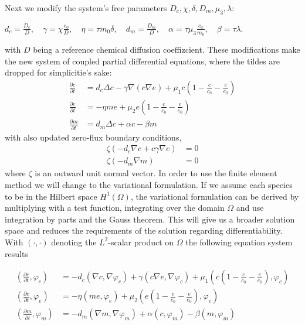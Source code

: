 Next we modify the system's free parameters $D_c, \chi, \delta, D_m, \mu_3, \lambda$:  
\begin{center}
    $d_c = \frac{D_c}{D},\quad \gamma = \chi \frac{e_0}{D},\quad \eta = \tau m_0 \delta,\quad d_m = \frac{D_m}{D},\quad \alpha = \tau \mu_3 \frac{c_0}{m_0},\quad \beta = \tau \lambda$.
\end{center} 
with $D$ being a reference chemical diffusion coeffizcient.\newline 
These modifications make the new system of coupled partial differential equations, where the tildes are dropped for simplicitie's sake:
\begin{align}
	\frac{\partial c}{\partial t} &= d_c \Delta c - \gamma \nabla (c\nabla e)  + \mu_1 c\left(1-\frac{c}{c_0}-\frac{e}{e_0}\right)\label{eq:6}\\
	\frac{\partial e}{\partial t} &= -\eta m e  + \mu_2 e\left(1-\frac{c}{c_0}-\frac{e}{e_0}\right)\label{eq:7}\\
	\frac{\partial m}{\partial t} &= d_m \Delta c + \alpha c - \beta m\label{eq:8}
\end{align}
with also updated zero-flux boundary conditions, 
\begin{align}
	\zeta (-d_c \nabla c + c \gamma \nabla e) &= 0\label{eq:9}\\
	\zeta (-d_m\nabla m ) &= 0\label{eq:10}
\end{align}
where $\zeta$ is an outward unit normal vector.\newline 
In order to use the finite element method we will change to the variational formulation. If we assume each species to be in the Hilbert space $H^1(\Omega)$, the variational formulation can be derived by multiplying with a test function, integrating over the domain $\Omega$ and use integration by parts and the Gauss theorem. This will give us a broader solution space and reduces the requirements of the solution regarding differentiability. With $\left(\cdot, \cdot\right)$ denoting the $L^2$-scalar product on $\Omega$ the following equation system results

\begin{align}
    \left(\frac{\partial c}{\partial t}, \varphi_c\right) &=
        - d_c\left(\nabla c, \nabla \varphi_c\right) + \gamma \left(c\nabla e, \nabla \varphi_c\right) + \mu_1 \left(c \left(1-\frac{c}{c_0} - \frac{e}{e_0}\right), \varphi_c\right) \label{eq:11}\\
    \left(\frac{\partial e}{\partial t}, \varphi_e\right) &=  -\eta \left( me, \varphi_e\right) + \mu_2 \left(e\left(1-\frac{c}{c_0}-\frac{e}{e_0}\right),\varphi_e\right) \label{eq:12}\\
    \left(\frac{\partial m}{\partial t}, \varphi_m\right) &= -d_m \left(\nabla m,\nabla \varphi_m\right) + \alpha \left(c,\varphi_m\right) - \beta \left(m,\varphi_m\right) \label{eq:13}
\end{align}

